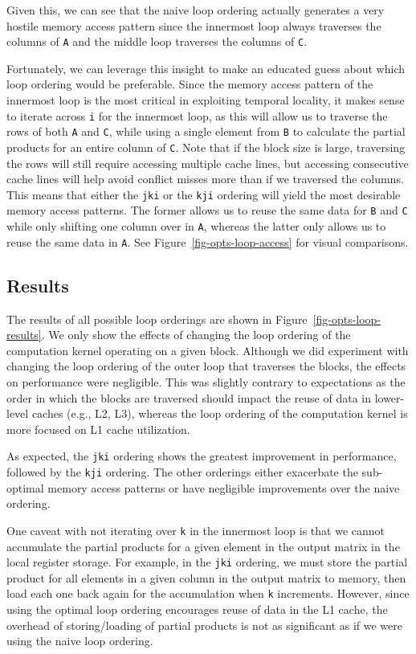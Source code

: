 Given this, we can see that the naive loop ordering actually generates a
very hostile memory access pattern since the innermost loop always
traverses the columns of {\tt{A}} and the middle loop traverses the
columns of {\tt{C}}.
\smallskip

Fortunately, we can leverage this insight to make an educated guess about
which loop ordering would be preferable. Since the memory access pattern
of the innermost loop is the most critical in exploiting temporal
locality, it makes sense to iterate across {\tt{i}} for the innermost
loop, as this will allow us to traverse the rows of both {\tt{A}} and
{\tt{C}}, while using a single element from {\tt{B}} to calculate the
partial products for an entire column of {\tt{C}}. Note that if the block
size is large, traversing the rows will still require accessing multiple
cache lines, but accessing consecutive cache lines will help avoid
conflict misses more than if we traversed the columns. This means that
either the {\tt{jki}} or the {\tt{kji}} ordering will yield the most
desirable memory access patterns. The former allows us to reuse the same
data for {\tt{B}} and {\tt{C}} while only shifting one column over in
{\tt{A}}, whereas the latter only allows us to reuse the same data in
{\tt{A}}. See Figure~\ref{fig-opts-loop-access} for visual comparisons.
\smallskip

\subsection{Results}



The results of all possible loop orderings are shown in
Figure~\ref{fig-opts-loop-results}. We only show the effects of changing
the loop ordering of the computation kernel operating on a given
block. Although we did experiment with changing the loop ordering of the
outer loop that traverses the blocks, the effects on performance were
negligible. This was slightly contrary to expectations as the order in
which the blocks are traversed should impact the reuse of data in
lower-level caches (e.g., L2, L3), whereas the loop ordering of the
computation kernel is more focused on L1 cache utilization.
\smallskip

As expected, the {\tt{jki}} ordering shows the greatest improvement in
performance, followed by the {\tt{kji}} ordering. The other orderings
either exacerbate the sub-optimal memory access patterns or have
negligible improvements over the naive ordering.
\smallskip

One caveat with not iterating over {\tt{k}} in the innermost loop is that
we cannot accumulate the partial products for a given element in the
output matrix in the local register storage. For example, in the
{\tt{jki}} ordering, we must store the partial product for all elements
in a given column in the output matrix to memory, then load each one back
again for the accumulation when {\tt{k}} increments. However, since using
the optimal loop ordering encourages reuse of data in the L1 cache, the
overhead of storing/loading of partial products is not as significant as
if we were using the naive loop ordering.
\medskip

\clearpage
